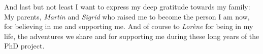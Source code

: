 And last but not least I want to express my deep gratitude towards my family: My parents, \emph{Martin}
and \emph{Sigrid} who raised me to become the person I am now, for believing in me and supporting me.
And of course to \emph{Lorène} for being in my life, the adventures we share and for supporting me during these long years of the PhD project.
